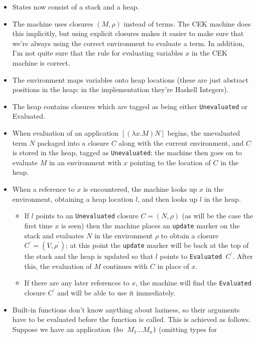\documentclass[a4paper]{article}
\begin{document}
\begin{itemize}
\item States now consist of a stack and a heap.
\item The machine uses closures $(M,\rho)$ instead of terms.  The CEK
  machine does this implicitly, but using explicit closures makes
  it easier to make sure that we're always using the correct
  environment to evaluate a term.  In addition, I'm not quite sure
  that the rule for evaluating variables $x$ in the CEK machine is
  correct.
\item The environment maps variables onto heap locations (these are
  just abstract positions in the heap: in the implementation they're
  Haskell Integers).
\item The heap contains closures which are tagged as being either
  \texttt{Unevaluated} or {Evaluated}.
\item When evaluation of an application $[(\lambda x.M) N]$ begins,
  the unevaluated term $N$ packaged into a closure $C$ along with the current
  environment, and $C$ is stored in the heap, tagged as 
  \texttt{Unevaluated}; the machine then goes on to evaluate $M$ in an
  environment with $x$ pointing to the location of $C$ in the heap.
\item When a reference to $x$ is encountered, the machine looks up $x$
  in the environment, obtaining a heap location $l$, and then looks up
  $l$ in the heap.  
  \begin{itemize} 
    \item If $l$ points to an \texttt{Unevaluated} closure $C = (N,
      \rho)$ (as will be the case the first time $x$ is seen) then the
      machine places an \texttt{update} marker on the stack and
      evaluates $N$ in the environment $\rho$ to obtain a closure $C^{\prime} =
      (V, \rho^{\prime})$; at this point the \texttt{update} marker
      will be back at the top of the stack and the heap is updated so
      that $l$ points to \texttt{Evaluated $C^{\prime}$}.  After this, the evaluation
      of $M$ continues with $C$ in place of $x$.
    \item If there are any later references to $x$, the machine will find
      the \texttt{Evaluated} closure $C^\prime$ and will be able to use it immediately.
  \end{itemize}
  \item Built-in functions don't know anything about laziness, so
    their arguments have to be evaluated before the function is
    called.  This is achieved as follows.  Suppose we have an
    application \texttt{($bn$ $M_1 \ldots M_n$)} (omitting types for

\end{itemize}
\end{document}
